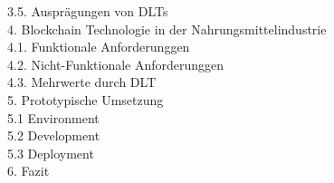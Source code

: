 \begin{small}
	\noindent\hspace*{10mm}%
	3.5. Ausprägungen von DLTs\\
	4. Blockchain Technologie in der Nahrungsmittelindustrie\\
	\noindent\hspace*{10mm}%
	4.1. Funktionale Anforderunggen\\
	\noindent\hspace*{10mm}%
	4.2. Nicht-Funktionale Anforderunggen\\
	\noindent\hspace*{10mm}%
	4.3. Mehrwerte durch DLT\\
	5. Prototypische Umsetzung\\
	\noindent\hspace*{10mm}%
	5.1 Environment\\
	\noindent\hspace*{10mm}%
	5.2 Development\\
	\noindent\hspace*{10mm}%
	5.3 Deployment\\
	6. Fazit\\
\end{small}

\newpage
